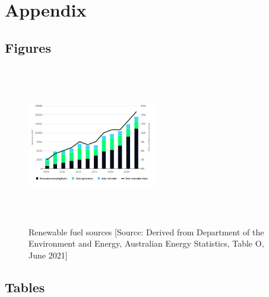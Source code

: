 \documentclass[mstat,12pt]{unswthesis}
\begin{document}
 


\chapter*{Appendix}\label{appendix}

\section*{\texorpdfstring{\textbf{Figures}}{Figures}}\label{figures}

\begin{figure}[H]
\centering
\includegraphics[width=0.5\textwidth,height=7cm]{renewable_fuel_sources_chart.png}
\caption{Renewable fuel sources [Source:
Derived from Department of the Environment and Energy, Australian Energy Statistics, Table O, June 2021]}\label{renewable}
\end{figure}

\section*{\texorpdfstring{\textbf{Tables}}{Tables}}\label{tables}
\end{document}
